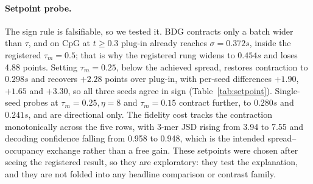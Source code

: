 \documentclass{article}
\begin{document}
\paragraph{Setpoint probe.} The sign rule is falsifiable, so we tested it. BDG contracts only a batch wider than $\tau$, and on CpG at $t\ge0.3$ plug-in already reaches $\sigma=0.372s$, inside the registered $\tau_m=0.5$; that is why the registered rung widens to $0.454s$ and loses 4.88 points. Setting $\tau_m=0.25$, below the achieved spread, restores contraction to $0.298s$ and recovers $+2.28$ points over plug-in, with per-seed differences $+1.90$, $+1.65$ and $+3.30$, so all three seeds agree in sign (Table~\ref{tab:setpoint}). Single-seed probes at $\tau_m=0.25,\eta=8$ and $\tau_m=0.15$ contract further, to $0.280s$ and $0.241s$, and are directional only. The fidelity cost tracks the contraction monotonically across the five rows, with 3-mer JSD rising from 3.94 to 7.55 and decoding confidence falling from 0.958 to 0.948, which is the intended spread--occupancy exchange rather than a free gain. These setpoints were chosen after seeing the registered result, so they are exploratory: they test the explanation, and they are not folded into any headline comparison or contrast family.
\end{document}
